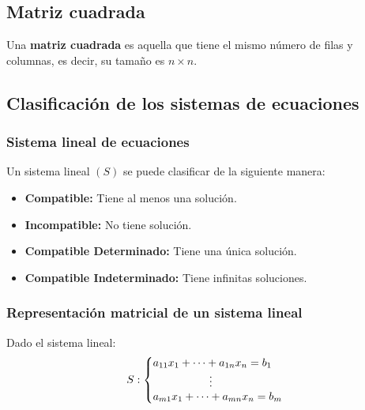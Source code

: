 \documentclass{article}
\begin{document}
    \subsection{Matriz cuadrada} Una \textbf{matriz cuadrada} es aquella que tiene el mismo número de filas y columnas, es decir, su tamaño es $n \times n$.

    \subsection{Clasificación de los sistemas de ecuaciones}

    \subsubsection*{Sistema lineal de ecuaciones}
    Un sistema lineal $(S)$ se puede clasificar de la siguiente manera:
    \begin{itemize}
        \item \textbf{Compatible:} Tiene al menos una solución.
        \item \textbf{Incompatible:} No tiene solución.
        \item \textbf{Compatible Determinado:} Tiene una única solución.
        \item \textbf{Compatible Indeterminado:} Tiene infinitas soluciones.
    \end{itemize}
    
    \subsubsection*{Representación matricial de un sistema lineal}
    
    Dado el sistema lineal:
    \[
    S: \left \{
    \begin{array}{@{}l@{}}
    a_{11}x_1 + \dots + a_{1n}x_n = b_1 \\
    \hspace{1.8cm}\vdots\\
    a_{m1}x_1 + \dots + a_{mn}x_n = b_m
    \end{array}
    \right.
    \]
    
\end{document}
